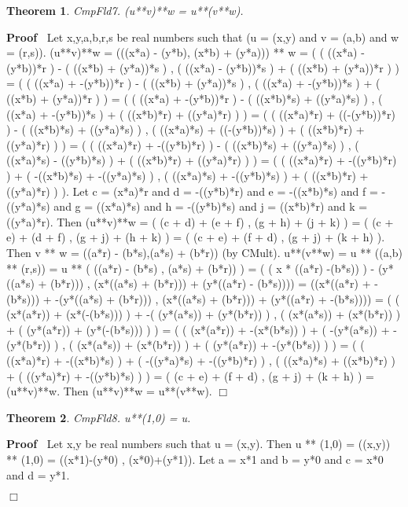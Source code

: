 \documentclass{article}
\newenvironment{forthel}{\begin{leftbar}}{\end{leftbar}}
\newenvironment{proof}{\noindent\textbf{Proof\ }}{\hspace*{\fill}$\Box$\medskip}
\newtheorem{theorem}{Theorem}
\begin{document}
\begin{forthel}
\begin{theorem}
 CmpFld7. (u**v)**w = u**(v**w).
\end{theorem}\begin{proof}
 Let x,y,a,b,r,s be real numbers such that (u = (x,y) and v = (a,b) and w = (r,s)). 
(u**v)**w = (((x*a) - (y*b), (x*b) + (y*a))) ** w 
= (  ( ((x*a)  - (y*b))*r ) - ( ((x*b) + (y*a))*s )  ,  ( ((x*a)  - (y*b))*s ) + ( ((x*b) + (y*a))*r ) )
= (  ( ((x*a) + -(y*b))*r ) - ( ((x*b) + (y*a))*s )  ,  ( ((x*a) + -(y*b))*s ) + ( ((x*b) + (y*a))*r ) )
= (  ( ((x*a) + -(y*b))*r ) - ( ((x*b)*s) + ((y*a)*s) )  ,  ( ((x*a) + -(y*b))*s ) + ( ((x*b)*r) + ((y*a)*r) )  )
= (  ( ((x*a)*r) + ((-(y*b))*r) ) - ( ((x*b)*s) + ((y*a)*s) )  ,  ( ((x*a)*s) + ((-(y*b))*s) ) + ( ((x*b)*r) + ((y*a)*r) )  ) 
= (  ( ((x*a)*r) + -((y*b)*r) ) - ( ((x*b)*s) + ((y*a)*s) )  ,  ( ((x*a)*s) - ((y*b)*s) ) + ( ((x*b)*r) + ((y*a)*r) )  )
= (  ( ((x*a)*r) + -((y*b)*r) ) + ( -((x*b)*s) + -((y*a)*s) )  ,  ( ((x*a)*s) + -((y*b)*s) ) + ( ((x*b)*r) + ((y*a)*r) )  ).
Let c = (x*a)*r and d = -((y*b)*r) and e = -((x*b)*s) and f = -((y*a)*s) and g = ((x*a)*s) and  h = -((y*b)*s) and  j = ((x*b)*r) and k = ((y*a)*r).
Then (u**v)**w =  ( (c + d) + (e  + f) , (g + h) +  (j + k)  )
=  ( (c + e) + (d + f) , (g +  j) + (h  + k) )
= ( (c + e) + (f + d) , (g + j) + (k + h) ).
Then v ** w = ((a*r) - (b*s),(a*s) + (b*r)) (by CMult).
u**(v**w) = u ** ((a,b) ** (r,s)) 
= u ** (  ((a*r) - (b*s) , (a*s) + (b*r))  )
= (  ( x * ((a*r) -(b*s)) ) - (y*((a*s) + (b*r))) , (x*((a*s) + (b*r))) + (y*((a*r) - (b*s))))
= ((x*((a*r) + -(b*s))) + -(y*((a*s) + (b*r))) , (x*((a*s) 	+ (b*r))) + (y*((a*r) + -(b*s))))
= (  ( (x*(a*r)) + (x*(-(b*s))) ) + -( (y*(a*s)) + (y*(b*r)) )  , ( (x*(a*s)) + (x*(b*r)) ) + ( (y*(a*r)) + (y*(-(b*s))) ) )
= (  ( (x*(a*r)) + -(x*(b*s)) ) + ( -(y*(a*s)) + -(y*(b*r)) )  ,  ( (x*(a*s)) + (x*(b*r)) ) + ( (y*(a*r)) + -(y*(b*s)) ) )
= (  ( ((x*a)*r) + -((x*b)*s) ) + ( -((y*a)*s) + -((y*b)*r) )  ,  ( ((x*a)*s) + ((x*b)*r) ) + ( ((y*a)*r) + -((y*b)*s) ) )
= ( (c + e) + (f + d) , (g + j) + (k + h) ) = (u**v)**w.
Then (u**v)**w = u**(v**w). \end{proof}



\begin{theorem}
 CmpFld8. u**(1,0) = u.
\end{theorem}\begin{proof}
 Let x,y be real numbers such that u = (x,y). Then u ** (1,0) = ((x,y)) ** (1,0) = ((x*1)-(y*0) , (x*0)+(y*1)). 
Let a = x*1 and b = y*0 and c = x*0 and d = y*1.


\end{proof}
\end{forthel}
\end{document}
